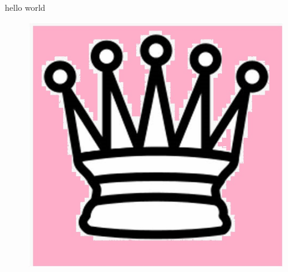 \documentclass{article}
\begin{document}
hello world
\begin{figure}[]
    \includegraphics[scale =0.5]{queen.jpg}
\end{figure}
\end{document}
